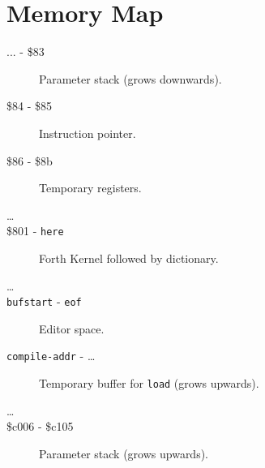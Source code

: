 \chapter{Memory Map}

\begin{description}
\item[... - \$83] Parameter stack (grows downwards).
\item[\$84 - \$85] Instruction pointer.
\item[\$86 - \$8b] Temporary registers.
\item[\ldots]
\item[\$801 - \texttt{here}] Forth Kernel followed by dictionary.
\item[\ldots]
\item[\texttt{bufstart} - \texttt{eof}] Editor space.
\item[\texttt{compile-addr} - \ldots] Temporary buffer for \texttt{load} (grows upwards).
\item[\ldots]
\item[\$c006 - \$c105] Parameter stack (grows upwards).
\end{description}

